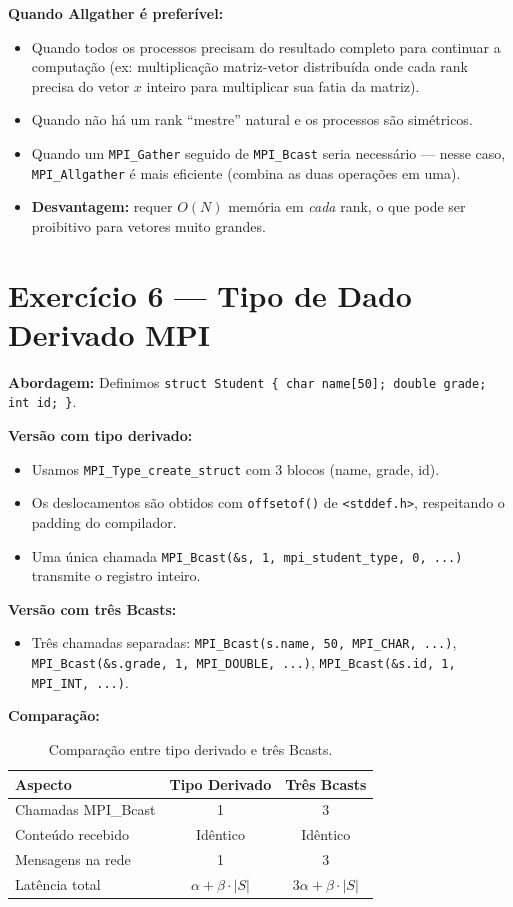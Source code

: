 \documentclass[12pt,a4paper]{article}
\begin{document}
\textbf{Quando Allgather é preferível:}
\begin{itemize}
    \item Quando todos os processos precisam do resultado completo para continuar a
    computação (ex: multiplicação matriz-vetor distribuída onde cada rank precisa
    do vetor $x$ inteiro para multiplicar sua fatia da matriz).
    \item Quando não há um rank ``mestre'' natural e os processos são simétricos.
    \item Quando um \texttt{MPI\_Gather} seguido de \texttt{MPI\_Bcast} seria
    necessário — nesse caso, \texttt{MPI\_Allgather} é mais eficiente (combina
    as duas operações em uma).
    \item \textbf{Desvantagem:} requer $O(N)$ memória em \textit{cada} rank, o que
    pode ser proibitivo para vetores muito grandes.
\end{itemize}

\section{Exercício 6 — Tipo de Dado Derivado MPI}

\textbf{Abordagem:} Definimos \texttt{struct Student \{ char name[50]; double grade; int id; \}}.

\textbf{Versão com tipo derivado:}
\begin{itemize}
    \item Usamos \texttt{MPI\_Type\_create\_struct} com 3 blocos (name, grade, id).
    \item Os deslocamentos são obtidos com \texttt{offsetof()} de \texttt{<stddef.h>},
    respeitando o padding do compilador.
    \item Uma única chamada \texttt{MPI\_Bcast(\&s, 1, mpi\_student\_type, 0, ...)}
    transmite o registro inteiro.
\end{itemize}

\textbf{Versão com três Bcasts:}
\begin{itemize}
    \item Três chamadas separadas: \texttt{MPI\_Bcast(s.name, 50, MPI\_CHAR, ...)},
    \texttt{MPI\_Bcast(\&s.grade, 1, MPI\_DOUBLE, ...)},
    \texttt{MPI\_Bcast(\&s.id, 1, MPI\_INT, ...)}.
\end{itemize}

\textbf{Comparação:}
\begin{table}[h]
\centering
\begin{tabular}{@{}lcc@{}}
\toprule
Aspecto & Tipo Derivado & Três Bcasts \\
\midrule
Chamadas MPI\_Bcast & 1 & 3 \\
Conteúdo recebido & Idêntico & Idêntico \\
Mensagens na rede & 1 & 3 \\
Latência total & $\alpha + \beta \cdot |S|$ & $3\alpha + \beta \cdot |S|$ \\
\bottomrule
\end{tabular}
\caption{Comparação entre tipo derivado e três Bcasts.}
\end{table}
\end{document}
